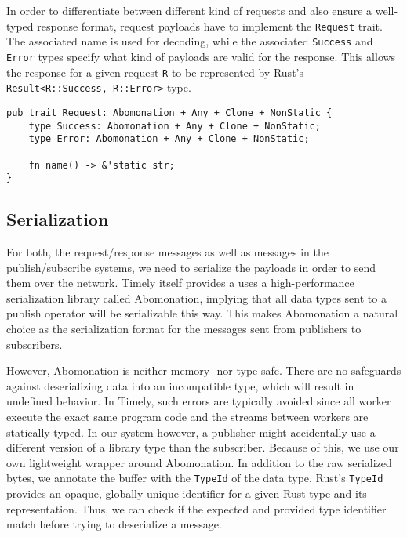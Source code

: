 In order to differentiate between different kind of requests and also ensure a
well-typed response format, request payloads have to implement the \lstinline{Request}
trait. The associated name is used for decoding, while the associated \lstinline{Success}
and \lstinline{Error} types specify what kind of payloads are valid for the response.
This allows the response for a given request \lstinline{R} to be represented by
Rust's \lstinline{Result<R::Success, R::Error>} type.

\begin{lstlisting}[caption={[Request trait]In order for a type to be used as a
request message, it needs to implement the \lstinline{Request} trait. The name allows
request handlers to differentiate between different types of requests, while the associated
types forces them to issue well-formed responses.
The trait bounds are explained in section \ref{sec:serialization}.}]
pub trait Request: Abomonation + Any + Clone + NonStatic {
    type Success: Abomonation + Any + Clone + NonStatic;
    type Error: Abomonation + Any + Clone + NonStatic;

    fn name() -> &'static str;
}
\end{lstlisting}

\subsection{Serialization} \label{sec:serialization}

For both, the request/response messages as well as messages in the publish/subscribe
systems, we need to serialize the payloads in order to send them over the network.
Timely itself provides a uses a high-performance serialization library called
Abomonation, implying that all data types sent to a publish operator will be
serializable this way. This makes Abomonation a natural choice as the serialization
format for the messages sent from publishers to subscribers. 

However, Abomonation is neither memory- nor type-safe. There are no safeguards
against deserializing data into an incompatible type, which will result in undefined
behavior. In Timely, such errors are typically avoided since all worker
execute the exact same program code and the streams between workers are
statically typed. In our system however, a publisher might accidentally use
a different version of a library type than the subscriber. Because of this,
we use our own lightweight wrapper around Abomonation. In addition to the raw
serialized bytes, we annotate the buffer with the \lstinline{TypeId} of the
data type. Rust's \lstinline{TypeId} provides an opaque, globally unique
identifier for a given Rust type and its representation. Thus, we can check
if the expected and provided type identifier match before trying to deserialize
a message.

